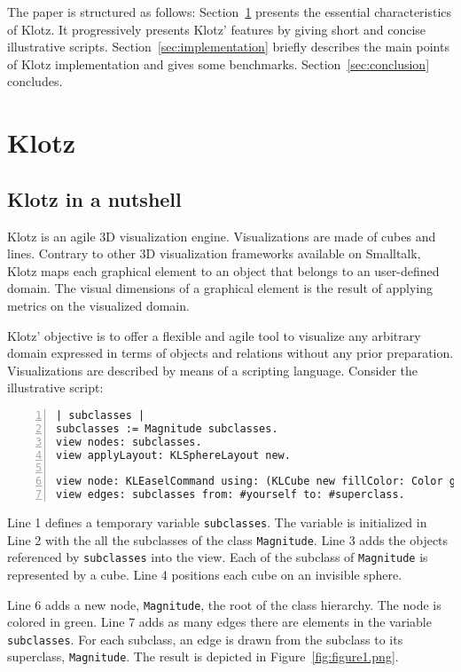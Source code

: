 \documentclass{sig-alternate}
\newcommand{\ct}{\lstinline[backgroundcolor=\color{white},basicstyle=\footnotesize\ttfamily]}
\newcommand{\seclabel}[1]{\label{sec:#1}}
\newcommand{\figref}[1]{Figure~\ref{fig:#1}}
\newcommand{\secref}[1]{Section~\ref{sec:#1}}
\begin{document}
The paper is structured as follows:
\secref{klotz} presents the essential characteristics of Klotz. It progressively presents Klotz' features by giving short and concise illustrative scripts. 
\secref{implementation} briefly describes the main points of Klotz implementation and gives some benchmarks.
\secref{conclusion} concludes.



\section{Klotz} \seclabel{klotz}

\subsection{Klotz in a nutshell} \seclabel{nutshell}
Klotz is an agile 3D visualization engine. Visualizations are made of cubes and lines. Contrary to other 3D visualization frameworks available on Smalltalk, Klotz maps each graphical element to an object that belongs to an user-defined domain. The visual dimensions of a graphical element is the result of applying metrics on the visualized domain. 

Klotz' objective is to offer a flexible and agile tool to visualize any arbitrary domain expressed in terms of objects and relations without any prior preparation. Visualizations are described by means of a scripting language. Consider the illustrative script:

\begin{lstlisting}[numbers=left]
| subclasses |
subclasses := Magnitude subclasses.
view nodes: subclasses.
view applyLayout: KLSphereLayout new.

view node: KLEaselCommand using: (KLCube new fillColor: Color green).
view edges: subclasses from: #yourself to: #superclass.   
\end{lstlisting}

Line 1 defines a temporary variable \ct{subclasses}. 
The variable is initialized in Line 2 with the all the subclasses of the class \ct{Magnitude}.
Line 3 adds the objects referenced by \ct{subclasses} into the view. Each of the subclass of \ct{Magnitude} is represented by a cube.
Line 4 positions each cube on an invisible sphere.

Line 6 adds a new node, \ct{Magnitude}, the root of the class hierarchy. The node is colored in green.
Line 7 adds as many edges there are elements in the variable \ct{subclasses}. For each subclass, an edge is drawn from the subclass to its superclass, \ct{Magnitude}. The result is depicted in \figref{figure1.png}.
\end{document}
